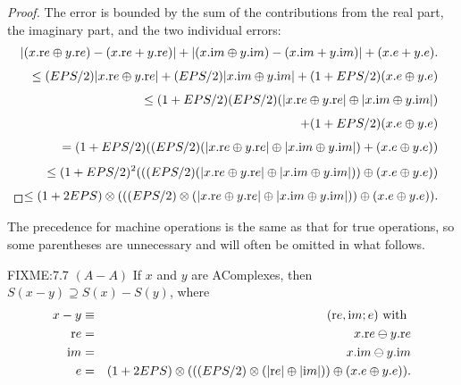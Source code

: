 \begin{definition}
\begin{proof}{}
The error is bounded by the sum of the contributions from the real part, the imaginary part, and the two individual errors:
\begin{eqnarray*}
 & &\hskip-20pt |(x.{\mathrm re} \oplus y.{\mathrm re}) -(x.{\mathrm re} + y.{\mathrm re})| + |(x.{\mathrm im} \oplus y.{\mathrm im}) -
(x.{\mathrm im} + y.{\mathrm im})| + (x.e + y.e).\\[4pt]
&&\hskip-12pt \le (EPS/2) |x.{\mathrm re} \oplus y.{\mathrm re}| + (EPS/2) |x.{\mathrm im} \oplus y.{\mathrm im}| + 
(1 + EPS/2) (x.e \oplus y.e)\\[4pt]
&&\hskip-12pt \le  (1 + EPS/2) (EPS/2)(|x.{\mathrm re} \oplus y.{\mathrm re}| \oplus 
 |x.{\mathrm im} \oplus y.{\mathrm im}| ) \\[4pt]
&&\hskip-12pt \qquad + (1 + EPS/2) (x.e \oplus y.e)\\[4pt]
&&\hskip-12pt = (1 + EPS/2) ((EPS/2)(|x.{\mathrm re} \oplus y.{\mathrm re}| \oplus 
 |x.{\mathrm im} \oplus y.{\mathrm im}| ) + (x.e \oplus y.e))\\[4pt]
&&\hskip-12pt \le (1 + EPS/2)^2 (((EPS/2) (|x.{\mathrm re} \oplus y.{\mathrm re}| \oplus 
 |x.{\mathrm im} \oplus y.{\mathrm im}| )) \oplus  (x.e \oplus y.e))\\[4pt]
&&\hskip-12pt \le   (1 + 2 EPS) \otimes (((EPS/2)\otimes (|x.{\mathrm re} \oplus
y.{\mathrm re}| \oplus |x.{\mathrm im} \oplus y.{\mathrm im}| )) \oplus (x.e \oplus y.e)).\\[4pt]
\noalign{\vskip-24pt}
\end{eqnarray*}
\end{proof}

The precedence for machine operations is the same as that for true operations, so some  parentheses are unnecessary
and will often be omitted in what
 follows.

\begin{proposition}{FIXME:7.7 $(A - A)$}
If $x$ and $y$ are {\textrm AComplexes,} then 
$S(x - y) \supseteq S(x) - S(y)${\textrm ,} where
\begin{eqnarray*}
x-y &\equiv& ({\mathrm re},{\mathrm im};e) \hbox{ with }\\
{\mathrm re}& =& x.{\mathrm re} \ominus y.{\mathrm re}\\
{\mathrm im}& =& x.{\mathrm im} \ominus y.{\mathrm im}\\
e &=& (1 + 2 EPS) \otimes ( ((EPS/2) \otimes (|{\mathrm re}| \oplus |{\mathrm im}|))
 \oplus (x.e \oplus y.e)).
\end{eqnarray*}
\end{proposition}



\end{definition}
